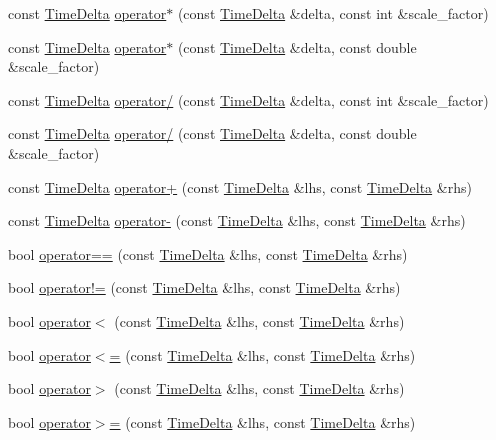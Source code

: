 \begin{DoxyCompactItemize}
\item 
const \hyperlink{structTimeDelta}{\-Time\-Delta} \hyperlink{structTimeDelta_ab7a91eba5b4f059a62b8514db14fc53b}{operator$\ast$} (const \hyperlink{structTimeDelta}{\-Time\-Delta} \&delta, const int \&scale\-\_\-factor)
\item 
const \hyperlink{structTimeDelta}{\-Time\-Delta} \hyperlink{structTimeDelta_adab5720acc96114e1dc60fee9e515cb8}{operator$\ast$} (const \hyperlink{structTimeDelta}{\-Time\-Delta} \&delta, const double \&scale\-\_\-factor)
\item 
const \hyperlink{structTimeDelta}{\-Time\-Delta} \hyperlink{structTimeDelta_ad9091904936708075238c1211784ac72}{operator/} (const \hyperlink{structTimeDelta}{\-Time\-Delta} \&delta, const int \&scale\-\_\-factor)
\item 
const \hyperlink{structTimeDelta}{\-Time\-Delta} \hyperlink{structTimeDelta_aa3ef692470498914c3a3da20f5689333}{operator/} (const \hyperlink{structTimeDelta}{\-Time\-Delta} \&delta, const double \&scale\-\_\-factor)
\item 
const \hyperlink{structTimeDelta}{\-Time\-Delta} \hyperlink{structTimeDelta_ab9dcf443fb6dde4d15657f270e5f1111}{operator+} (const \hyperlink{structTimeDelta}{\-Time\-Delta} \&lhs, const \hyperlink{structTimeDelta}{\-Time\-Delta} \&rhs)
\item 
const \hyperlink{structTimeDelta}{\-Time\-Delta} \hyperlink{structTimeDelta_a0298dd60abe0bb412961af7325925999}{operator-\/} (const \hyperlink{structTimeDelta}{\-Time\-Delta} \&lhs, const \hyperlink{structTimeDelta}{\-Time\-Delta} \&rhs)
\item 
bool \hyperlink{structTimeDelta_a9a4d0c810cfb1ede0c5abd2058ffa880}{operator==} (const \hyperlink{structTimeDelta}{\-Time\-Delta} \&lhs, const \hyperlink{structTimeDelta}{\-Time\-Delta} \&rhs)
\item 
bool \hyperlink{structTimeDelta_a34ecf194f14217e5a53721b47b55afea}{operator!=} (const \hyperlink{structTimeDelta}{\-Time\-Delta} \&lhs, const \hyperlink{structTimeDelta}{\-Time\-Delta} \&rhs)
\item 
bool \hyperlink{structTimeDelta_a46cbd1394d5b9a671a2663d1ec292133}{operator$<$} (const \hyperlink{structTimeDelta}{\-Time\-Delta} \&lhs, const \hyperlink{structTimeDelta}{\-Time\-Delta} \&rhs)
\item 
bool \hyperlink{structTimeDelta_af313f41f00c31292ebf02d238270f925}{operator$<$=} (const \hyperlink{structTimeDelta}{\-Time\-Delta} \&lhs, const \hyperlink{structTimeDelta}{\-Time\-Delta} \&rhs)
\item 
bool \hyperlink{structTimeDelta_a321108cfb9e3902874cc743d899c4076}{operator$>$} (const \hyperlink{structTimeDelta}{\-Time\-Delta} \&lhs, const \hyperlink{structTimeDelta}{\-Time\-Delta} \&rhs)
\item 
bool \hyperlink{structTimeDelta_a044ffed3fee34cab3b4abaf4869c5c0c}{operator$>$=} (const \hyperlink{structTimeDelta}{\-Time\-Delta} \&lhs, const \hyperlink{structTimeDelta}{\-Time\-Delta} \&rhs)
\end{DoxyCompactItemize}



